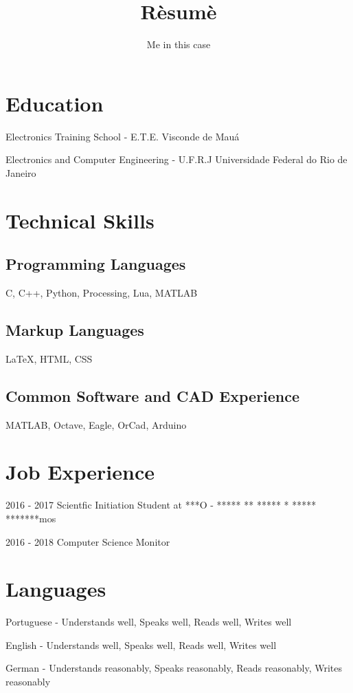\documentclass {article}
\begin{document}
\title {R\`esum\`e}
\author {Me in this case}

\maketitle {}

\section {Education}

Electronics Training School - E.T.E. Visconde de Mauá


Electronics and Computer Engineering - U.F.R.J Universidade Federal do Rio de Janeiro

\section {Technical Skills}

\subsection {Programming Languages}

C, C++, Python, Processing, Lua, MATLAB

\subsection {Markup Languages}

{\LaTeX}, HTML, CSS

\subsection {Common Software and CAD Experience}

MATLAB, Octave, Eagle, OrCad, Arduino

\section {Job Experience}

2016 - 2017
Scientfic Initiation Student at ***O - ***** ** ***** * ***** *******mos


2016 - 2018
Computer Science Monitor




\section {Languages}

Portuguese - Understands well, Speaks well, Reads well, Writes well


English - Understands well, Speaks well, Reads well, Writes well


German - Understands reasonably, Speaks reasonably, Reads reasonably, Writes reasonably 
\end{document}
